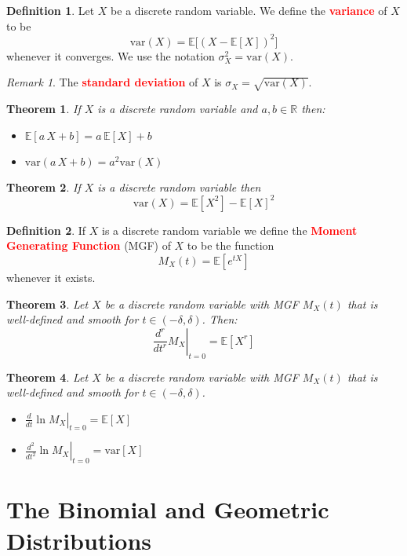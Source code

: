 \documentclass{article}
\newcommand{\R}{\mathbb{R}}
\newcommand{\E}{\mathbb{E}}
\newcommand{\var}{\text{var}}
\newcommand{\bfred}[1]{\textcolor{red}{\textbf{#1}}}
\theoremstyle{plain}
\newtheorem{thm}{Theorem}[section]
\theoremstyle{definition}
\newtheorem{defn}{Definition}[section]
\theoremstyle{remark}
\newtheorem*{rem}{Remark}
\begin{document}
\begin{defn}
    Let $X$ be a discrete random variable. We define the \bfred{variance} of $X$ to be \[\var(X) = \E\Big[(X-\E[X])^2\Big]\] whenever it converges. We use the notation $\sigma_X^2 = \var(X)$.
\end{defn}

\begin{rem}
    The \bfred{standard deviation} of $X$ is $\sigma_X = \sqrt{\var(X)}$.
\end{rem}

\begin{thm}
    If $X$ is a discrete random variable and $a, b \in \R$ then:
    \begin{itemize}
        \item $\E[a\,X + b] = a\,\E[X] + b$
        \item $\var(a\,X + b) = a^2\var(X)$
    \end{itemize}
\end{thm}

\begin{thm}
    If $X$ is a discrete random variable then \[\var(X) = \E[X^2] - \E[X]^2\]
\end{thm}

\begin{defn}
    If $X$ is a discrete random variable we define the \bfred{Moment Generating Function} (MGF) of $X$ to be the function \[M_X(t) = \E[e^{tX}]\] whenever it exists.
\end{defn}

\begin{thm}
    Let $X$ be a discrete random variable with MGF $M_X(t)$ that is well-defined and smooth for $t \in (-\delta, \delta)$. Then: \[\left.\frac{d^r}{dt^r}M_X\right\vert_{t=0}=\E[X^r]\]
\end{thm}

\begin{thm}
    Let $X$ be a discrete random variable with MGF $M_X(t)$ that is well-defined and smooth for $t \in (-\delta, \delta)$.
    \begin{itemize}
        \item $\displaystyle\left.\frac{d}{dt}\ln M_X\right\vert_{t=0} = \E[X]$
        \item $\displaystyle\left.\frac{d^2}{dt^2}\ln M_X\right\vert_{t=0} = \var[X]$
    \end{itemize}
\end{thm}

\section{The Binomial and Geometric Distributions}
\end{document}
